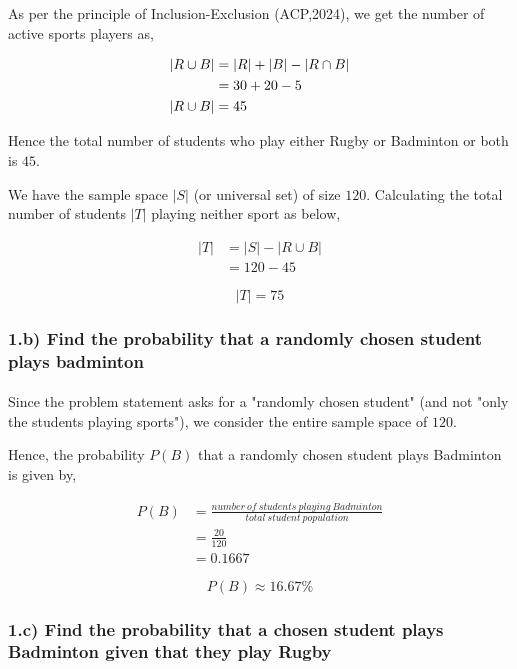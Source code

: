 \documentclass[a4paper]{report}
\begin{document}
As per the principle of Inclusion-Exclusion (ACP,2024), we get the number of active sports players as,



\begin{align}
    \notag|R\cup B|&=|R|+|B|-|R\cap B| \\
    \notag&=30+20-5\\
    |R\cup B|&=45
\end{align}

Hence the total number of students who play either Rugby or Badminton or both is $45$.

We have the sample space $|S|$ (or universal set) of size $120$. Calculating the total number of students $|T|$ playing neither sport as below,

\begin{align*}
    |T|&=|S|-|R\cup B| \\
    &=120-45
\end{align*}

\begin{equation}
  \boxed{|T|=75}
\end{equation}


\subsubsection*{1.b) Find  the probability that a randomly chosen student plays badminton}

\paragraph{}

Since the problem statement asks for a "randomly chosen student" (and not "only the students playing sports"), we consider the entire sample space of $120$.

Hence, the probability $P(B)$ that a randomly chosen student plays Badminton is given by,

\begin{align*}
    P(B)&=\frac{number\ of\ students\ playing\ Badminton}{total\ student\ population} \\
    &=\frac{20}{120}\\
    &=0.1667
\end{align*}

\begin{equation}
    \boxed{P(B) \approx 16.67\%}
\end{equation}


\subsubsection*{1.c) Find  the probability that a chosen student plays Badminton given that they play Rugby}
\end{document}
